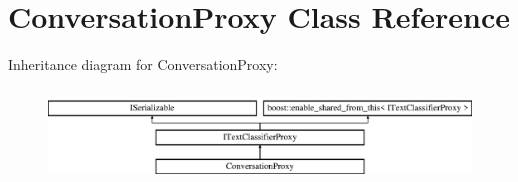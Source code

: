 \hypertarget{class_conversation_proxy}{}\section{Conversation\+Proxy Class Reference}
\label{class_conversation_proxy}
Inheritance diagram for Conversation\+Proxy\+:\begin{figure}[H]
\begin{center}
\leavevmode
\includegraphics[height=2.514970cm]{class_conversation_proxy}
\end{center}
\end{figure}
